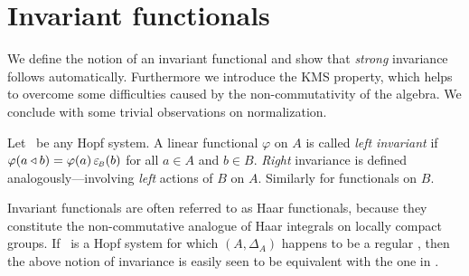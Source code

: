 \section{Invariant functionals}


\begin{abs_chp}
We define the notion of an invariant functional
and show that {\em strong\/} invariance follows automatically.
Furthermore we introduce the {\scriptsize KMS} property, which helps to overcome
some difficulties caused by the non-commutativity of the algebra.
We conclude with some trivial observations on normalization.
\end{abs_chp}




\begin{defn_sec} \label{def:invariant_functional}
  Let \pairAB\ be any Hopf system. A linear functional $\varphi$ on $A$ is called
  {\em left invariant\/} if
  $\varphi(a \triangleleft b) = \varphi(a) \, \varepsilon_{\scriptscriptstyle \! B}(b)$ for all $a\in A$ and $b \in B$.
  {\em Right\/} invariance is defined analogously---involving
  {\em left\/} actions of $B$ on $A$. Similarly for functionals on $B$.
\end{defn_sec}

{\small
Invariant functionals are often referred to as Haar functionals,
because they constitute the non-commutative analogue of Haar integrals on
locally compact groups.
If \pairAB\ is a Hopf system for which $(A,\Delta_A)$ happens to be a regular \mha,
then the above notion of invariance is easily seen to be equivalent with
the one in \cite{Fons:AFGD}.}


